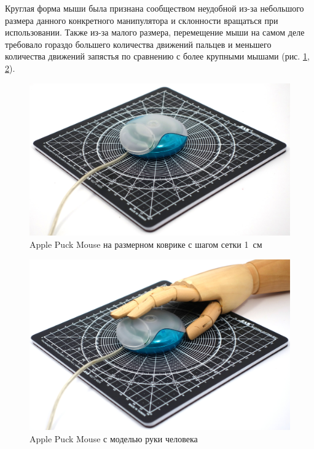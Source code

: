 \documentclass[11pt, a4paper]{article}
\begin{document}
Круглая форма мыши была признана сообществом неудобной из-за небольшого размера данного конкретного манипулятора и склонности вращаться при использовании.
Также из-за малого размера, перемещение мыши на самом деле требовало гораздо большего количества движений  пальцев и  меньшего количества движений запястья по сравнению с более крупными мышами (рис. \ref{fig:size}, \ref{fig:hand}).

\begin{figure}[h]
    \centering
    \includegraphics[scale=0.3]{1998_apple_puck/appleset60.jpg}
    \caption{Apple Puck Mouse на размерном коврике с шагом сетки 1~см}
    \label{fig:size}
\end{figure}

\begin{figure}[h]
    \centering
    \includegraphics[scale=0.3]{1998_apple_puck/appleset62.jpg}
    \caption{Apple Puck Mouse с моделью руки человека}
    \label{fig:hand}
\end{figure}
\end{document}
